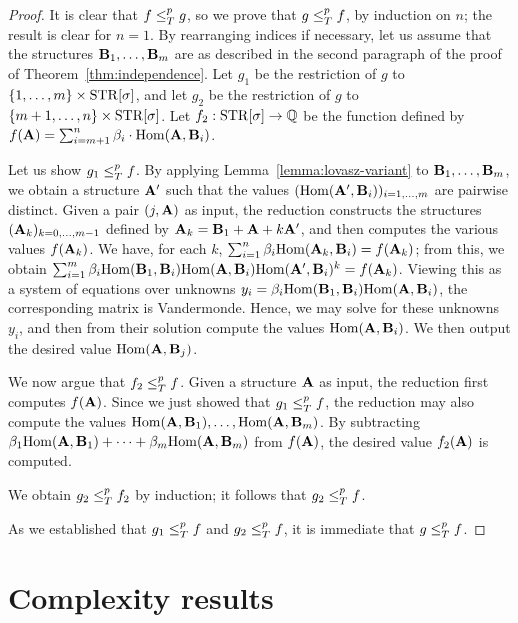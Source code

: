 \documentclass[11pt]{article}
\begin{document}
\begin{proof}
It is clear that $f \leq_T^p g$, so we prove that $g \leq_T^p f$,
by induction on $n$; the result is clear for $n=1$.
By rearranging indices if necessary, let us assume that
the structures $\mathbf{B}_1, \ldots, \mathbf{B}_m$ are as described
in the second paragraph of the proof of Theorem~\ref{thm:independence}.
Let $g_1$ be the restriction of $g$ to
$ \{ 1, \ldots, m \} \times \mathrm{STR}[\sigma]$,
and
let $g_2$ be the restriction of $g$ to
$ \{ m+1, \ldots, n \} \times \mathrm{STR}[\sigma]$.
Let $f_2: \mathrm{STR}[\sigma] \to \mathbb{Q}$ be the function defined by
$f(\mathbf{A}) = \sum_{i=m+1}^{n} \beta_i \cdot \mathrm{Hom}(\mathbf{A},\mathbf{B}_i)$.

Let us show $g_1 \leq_T^p f$.
By applying Lemma~\ref{lemma:lovasz-variant}
to $\mathbf{B}_1, \ldots, \mathbf{B}_m$,
we obtain a structure $\mathbf{A}'$ such that
the values $(\mathrm{Hom}(\mathbf{A}',\mathbf{B}_i))_{i=1,\ldots,m}$
are pairwise distinct.
Given a pair $(j,\mathbf{A})$ as input,
the reduction constructs
the structures $(\mathbf{A}_k)_{k=0,\ldots,m-1}$
defined by $\mathbf{A}_k = \mathbf{B}_1 + \mathbf{A} + k \mathbf{A}'$,
and then computes the various values $f(\mathbf{A}_k)$.
We have, for each $k$,
$\sum_{i=1}^n \beta_i \mathrm{Hom}(\mathbf{A}_k,\mathbf{B}_i) = f(\mathbf{A}_k)$;
from this, we obtain
$\sum_{i=1}^m \beta_i \mathrm{Hom}(\mathbf{B}_1,\mathbf{B}_i) \mathrm{Hom}(\mathbf{A},\mathbf{B}_i) \mathrm{Hom}(\mathbf{A}',\mathbf{B}_i)^k = f(\mathbf{A}_k)$.
Viewing this as a system of equations over unknowns
$y_i = \beta_i \mathrm{Hom}(\mathbf{B}_1,\mathbf{B}_i) \mathrm{Hom}(\mathbf{A},\mathbf{B}_i)$,
the corresponding matrix is Vandermonde.
Hence, we may solve for these unknowns $y_i$,
and then from their solution compute the values $\mathrm{Hom}(\mathbf{A},\mathbf{B}_i)$.
We then output the desired value $\mathrm{Hom}(\mathbf{A},\mathbf{B}_j)$.

We now argue that $f_2 \leq_T^p f$.
Given a structure $\mathbf{A}$ as input,
the reduction first computes $f(\mathbf{A})$.  
Since we just showed that $g_1 \leq_T^p f$,
the reduction may also compute the values 
$\mathrm{Hom}(\mathbf{A},\mathbf{B}_1),\ldots,\mathrm{Hom}(\mathbf{A},\mathbf{B}_m)$.
By subtracting 
$\beta_1 \mathrm{Hom}(\mathbf{A},\mathbf{B}_1) + \cdots + \beta_m \mathrm{Hom}(\mathbf{A},\mathbf{B}_m)$
from $f(\mathbf{A})$, the desired value $f_2(\mathbf{A})$ is computed.

We obtain $g_2 \leq_T^p f_2$ by induction; it follows that $g_2 \leq_T^p f$.

As we established that $g_1 \leq_T^p f$ and $g_2 \leq_T^p f$,
it is immediate that $g \leq_T^p f$.
\end{proof}


\section{Complexity results}
\newcommand{\fp}{\mathsf{FP}}
\newcommand{\sharpp}{\mathsf{\sharp P}}
\end{document}
